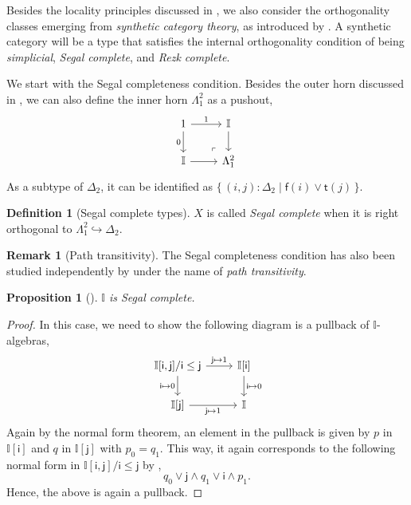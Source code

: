 \documentclass[a4paper,12pt]{amsart}
\newtheorem{proposition}[theorem]{Proposition}
\theoremstyle{definition}
\newtheorem{definition}[theorem]{Definition}
\newtheorem{remark}[theorem]{Remark}
\newcommand{\mbb}[1]{\mathbb{#1}}
\newcommand{\I}{\mbb I}
\newcommand{\ms}[1]{\mathsf{#1}}
\newcommand{\scomp}[2]{\{\,#1\mid#2\,\}}
\newcommand{\hook}{\hookrightarrow}
\newcommand\istsym{\ms{t}}
\newcommand\isfsym{\ms{f}}
\newcommand\ist[1]{\istsym(#1)}
\newcommand\isf[1]{\isfsym(#1)}
\begin{document}
Besides the locality principles discussed in , we also consider the orthogonality classes emerging from \emph{synthetic category theory}, as introduced by \citet{riehl2017type}. 
A synthetic category will be a type that satisfies the internal orthogonality condition of being \emph{simplicial}, \emph{Segal complete}, and \emph{Rezk complete}.

We start with the Segal completeness condition. Besides the outer horn discussed in , we can also define the inner horn $\Lambda^2_1$ as a pushout,
\[
  \begin{tikzcd}
    1 \ar[d, "0"'] \ar[r, "1"] & \I \ar[d] \\
    \I \ar[r] & \Lambda^2_1
    \arrow["\lrcorner"{anchor=center, pos=0.125, rotate=180}, draw=none, from=2-2, to=1-1]
  \end{tikzcd}
\]
As a subtype of $\Delta_2$, it can be identified as $\scomp{(i,j) : \Delta_2}{\isf{i} \vee \ist{j}}$.

\begin{definition}[Segal complete types]
  $X$ is called \emph{Segal complete} when it is right orthogonal to $\Lambda^2_1 \hook \Delta_2$.
\end{definition}

\begin{remark}[Path transitivity]
  The Segal completeness condition has also been studied independently by \citet{fiore2001domains} under the name of \emph{path transitivity}.
\end{remark}

\begin{proposition}[\AxiomSQCF]
  $\I$ is Segal complete.
\end{proposition}
\begin{proof}
  In this case, we need to show the following diagram is a pullback of $\I$-algebras, 
  \[
  \begin{tikzcd}
    \I[\ms{i},\ms{j}]/\ms{i}\le\ms{j} \ar[r, "\ms{j} \mapsto 1"] \ar[d, "\ms{i} \mapsto 0"'] & \I[\ms{i}] \ar[d, "\ms{i}\mapsto 0"] \\
    \I[\ms{j}] \ar[r, "\ms{j} \mapsto 1"'] & \I
  \end{tikzcd}
  \]
  Again by the normal form theorem, an element in the pullback is given by $p$ in $\I[\ms{i}]$ and $q$ in $\I[\ms{j}]$ with $p_0 = q_1$. This way, it again corresponds to the following normal form in $\I[\ms{i},\ms{j}]/\ms{i} \le \ms{j}$ by ,
  \[ q_0 \vee \ms{j} \wedge q_1 \vee \ms{i} \wedge p_1\text{.} \]
  Hence, the above is again a pullback.
\end{proof}
\end{document}
